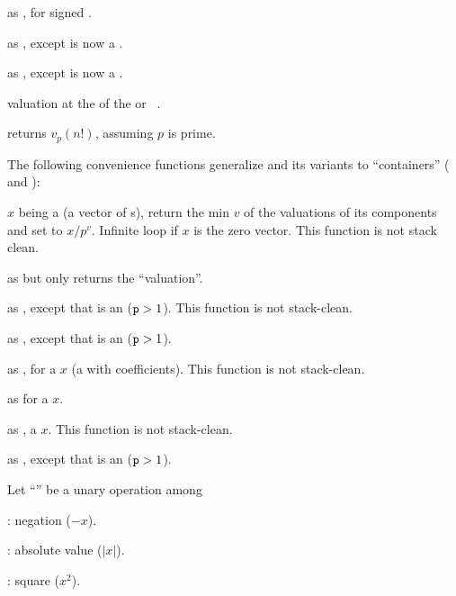  as , for signed .

 as ,
except  is now a .

 as ,
except  is now a .

 valuation at the  
of the  or ~.

 returns $v_p(n!)$, assuming
$p$ is prime.


The following convenience functions generalize  and its variants
to ``containers'' ( and ):


 $x$ being a  (a vector
of s), return the min $v$ of the valuations of its components and
set  to $x/p^v$. Infinite loop if $x$ is the zero vector.
This function is not stack clean.

 as  but only returns the
``valuation''.

 as ,
except that  is an  (${\tt p} > 1$).
This function is not stack-clean.

 as ,
except that  is an  (${\tt p} > 1$).


 as , for
a  $x$ (a  with  coefficients).
This function is not stack-clean.

 as  for a  $x$.

 as ,
a  $x$.
This function is not stack-clean.

 as ,
except that  is an  (${\tt p} > 1$).

 Let ``\op'' be a unary operation among

\item {}: negation ($-x$).

\item {}: absolute value ($|x|$).

\item {}: square ($x^2$).

